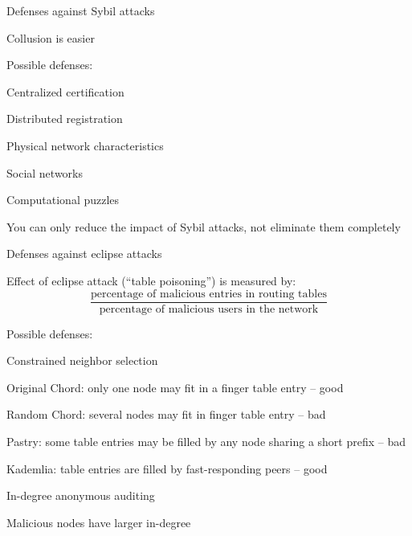 \begin{frame}{Defenses against Sybil attacks}

\BIL
\item Collusion is easier 
\item Possible defenses:
	\BI
	\item Centralized certification
	\item Distributed registration
	\item Physical network characteristics
	\item Social networks
	\item Computational puzzles
	\EI
\item You can only reduce the impact of Sybil attacks, not eliminate them
completely
\EIL

\end{frame}

\begin{frame}{Defenses against eclipse attacks}

\BIL
\item Effect of eclipse attack (“\alert{table poisoning}”) is measured by:
\[
  \frac{
    \textrm{percentage of malicious entries in routing tables}}{
	\textrm{percentage of malicious users in the network}
   }
\]
\item Possible defenses:
\BI
\item Constrained neighbor selection
  \BI
  \item Original Chord: only one node may fit in a finger table entry -- good
  \item Random Chord: several nodes may fit in finger table entry -- bad
  \item Pastry: some table entries may be filled by any node sharing a short prefix -- bad
  \item Kademlia: table entries are filled by fast-responding peers -- good
  \EI
\item In-degree anonymous auditing
  \BI
  \item Malicious nodes have larger in-degree
  \EI
\EI

\EIL

\end{frame}

